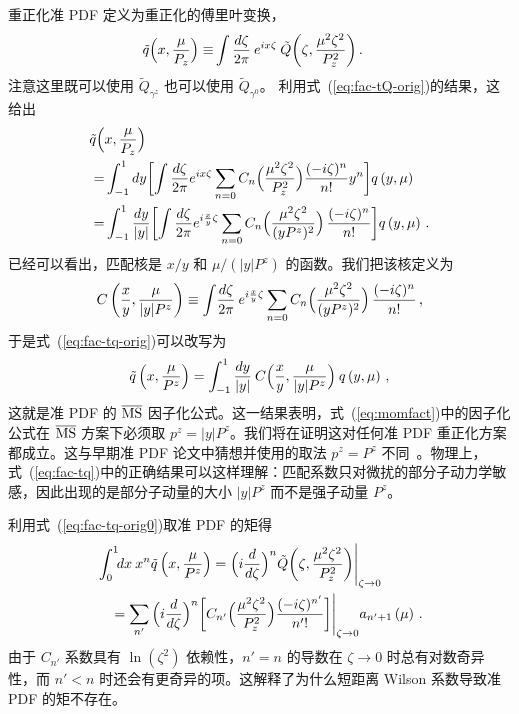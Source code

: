 重正化准 PDF 定义为重正化\spcorr 的傅里叶变换，
\begin{align} \label{eq:fac-tq-orig0}
\tilde{q} \Bigl(  x, \frac{\mu}{P_z}\Bigr)
\equiv &\int \frac{d \zeta}{2 \pi}\: e^{ix \zeta}\:  \tilde{Q} \biggl(\zeta, \frac{{\mu}^2\zeta^2}{P_z^2}\biggr) \,.
\end{align}
注意这里既可以使用 $\tilde{Q}_{\gamma^z}$ 也可以使用 $\tilde{Q}_{\gamma^0}$。
利用式~(\ref{eq:fac-tQ-orig})的结果，这给出
\begin{align} \label{eq:fac-tq-orig}
\tilde{q} \Bigl( & x, \frac{\mu}{P_z}\Bigr)
 \\
= &  \int_{-1}^1 dy \biggl[ \int \frac{d \zeta}{2 \pi} e^{ix \zeta}
\sum_{n=0} C_n \Bigl( \frac{{\mu}^2\zeta^2}{P_z^2}\Bigr)  \frac{(-i
	\zeta)^n}{n!} y^n \biggr] q \left( y, \mu \right)
\nonumber\\
= &  \int_{-1}^1 {dy\over |y|} \biggl[\int \frac{d \zeta}{2 \pi} e^{i
	\frac{x}{y} \zeta}  \sum_{n=0} C_n \Bigl( \frac{{\mu}^2\zeta^2 }{(yP^z)^2}\Bigr)\,  \frac{(-i \zeta)^n}{n!}  \biggr] q \left( y,\mu \right) \,.
  \nonumber
\end{align}
已经可以看出，匹配核是 $x / y$
和 $\mu / (|y|P^z)$ 的函数。我们把该核定义为
\begin{align}   \label{eq:fac-c}
C \left( {x\over y}, \frac{\mu}{|y|P^z} \right)
   \equiv \int\! \frac{d \zeta}{2 \pi} \: e^{i {x\over y} \zeta}
   \sum_{n=0} C_n \Bigl(
\frac{{\mu}^2\zeta^2}{(yP^z)^2}\Bigr) \, \frac{(-i \zeta)^n}{n!}
 \,,
\end{align}
于是式~(\ref{eq:fac-tq-orig})可以改写为
\begin{align} \label{eq:fac-tq}
\tilde{q} \left( x, \frac{\mu}{P^z}\right)
  = \int_{-1}^1 \frac{dy}{|y|}\: C \Bigl(
   \frac{x}{y}, \frac{\mu}{|y|P^z} \Bigr)\: q \left( y,\mu\right)
   \,,
\end{align}
这就是准 PDF 的 $\overline{\rm MS}$ 因子化公式。这一结果表明，式~(\ref{eq:momfact})中的因子化公式在 $\overline{\rm MS}$ 方案下必须取 $p^z=|y|P^z$。我们将在证明这对任何准 PDF 重正化方案都成立。这与早期准 PDF 论文中猜想并使用的取法 $p^z=P^z$ 不同~\cite{Ji:2013dva,Ji:2014gla,Xiong:2013bka}。物理上，式~(\ref{eq:fac-tq})中的正确结果可以这样理解：匹配系数只对微扰的部分子动力学敏感，因此出现的是部分子动量的大小 $|y| P^z$ 而不是强子动量 $P^z$。

利用式~(\ref{eq:fac-tq-orig0})取准 PDF 的矩得
\begin{align} \label{eq:momentqpdf}
 &\int_0^1\!\! dx\: x^n \tilde{q} \left( x, \frac{\mu}{P^z}\right)
= \Big(i\frac{d}{d\zeta}\Big)^n \tilde{Q} \biggl(\zeta, \frac{{\mu}^2\zeta^2}{P_z^2}\biggr) \Bigg|_{\zeta\to 0}
 \\
& \quad =  \sum_{n'}  \Big(i\frac{d}{d\zeta}\Big)^n \bigg[ C_{n'} \Big(\frac{{\mu}^2 \zeta^2}{P_z^2}\Big)  \frac{(-i \zeta)^{n'}}{n'!} \bigg] \Bigg|_{\zeta\to 0}  a_{n' + 1}
\left(\mu\right) \,.  \nonumber
\end{align}
由于 $C_{n'}$ 系数具有 $\ln(\zeta^2)$ 依赖性，$n'=n$ 的导数在 $\zeta\to 0$ 时总有对数奇异性，而 $n'<n$ 时还会有更奇异的项。这解释了为什么短距离 Wilson 系数导致准 PDF 的矩不存在。


